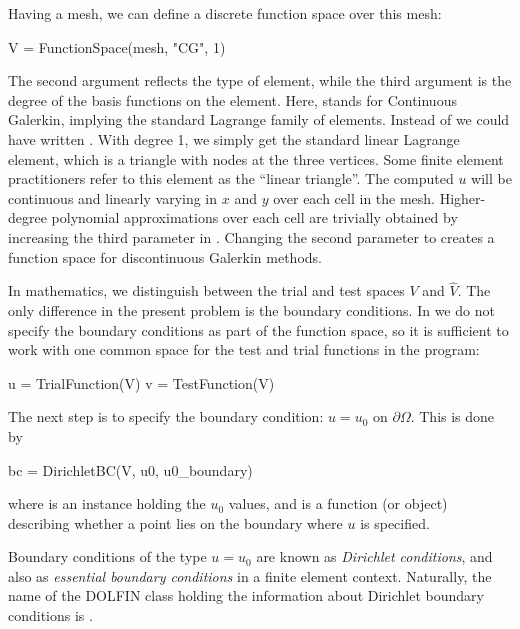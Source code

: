 Having a mesh, we can define a discrete function space  over this mesh:
\begin{python}
V = FunctionSpace(mesh, "CG", 1)
\end{python}
The second argument reflects the type of element, while the third
argument is the degree of the basis functions on the element.
 Here, 
stands for Continuous Galerkin, implying the standard Lagrange family
of elements.  Instead of  we could
have written .  With degree
1, we simply get the standard linear Lagrange element, which is a
triangle with nodes at the three vertices.  Some finite element
practitioners refer to this element as the ``linear triangle''.  The
computed $u$ will be continuous and linearly varying in $x$ and $y$
over each cell in the mesh.  Higher-degree polynomial approximations
over each cell are trivially obtained by increasing the third
parameter in . Changing
the second parameter to  creates a
function space for discontinuous Galerkin methods.

In mathematics, we distinguish between the trial and test
spaces $V$ and $\hat{V}$. The only difference in the present problem
is the boundary conditions. In \fenics{} we do not specify the boundary
conditions as part of the function space, so it is sufficient to work
with one common space  for the test and trial functions in the
program:
\begin{python}
u = TrialFunction(V)
v = TestFunction(V)
\end{python}

The next step is to specify the boundary condition: $u=u_0$ on
$\partial\Omega$. This is done by
\begin{python}
bc = DirichletBC(V, u0, u0_boundary)
\end{python}
where  is an instance holding the $u_0$ values,
and  is a function (or object) describing whether a point lies
on the boundary where $u$ is specified.

Boundary conditions
of the type $u=u_0$ are known as \emph{Dirichlet conditions}, and also
as \emph{essential boundary conditions} in a finite element context.
Naturally, the name of the DOLFIN class holding the information about
Dirichlet boundary conditions is .

